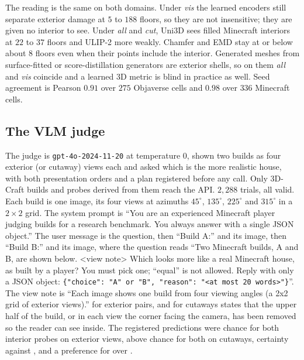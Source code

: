 The reading is the same on both domains. Under \emph{vis} the learned encoders still
separate exterior damage at $5$ to $188$ floors, so they are not insensitive; they are given
no interior to see. Under \emph{all} and \emph{cut}, Uni3D sees filled Minecraft interiors
at $22$ to $37$ floors and ULIP-2 more weakly. Chamfer and EMD stay at or below about $8$
floors even when their points include the interior. Generated meshes from surface-fitted or
score-distillation generators are exterior shells, so on them \emph{all} and \emph{vis}
coincide and a learned 3D metric is blind in practice as well. Seed agreement is Pearson
$0.91$ over $275$ Objaverse cells and $0.98$ over $336$ Minecraft cells.



\subsection{The VLM judge}
\label{app:vlm}

The judge is \texttt{gpt-4o-2024-11-20} at temperature $0$, shown two builds as four
exterior (or cutaway) views each and asked which is the more realistic house, with both
presentation orders and a plan registered before any call. Only 3D-Craft builds and probes
derived from them reach the API. $2{,}288$ trials, all valid. Each build is one image, its
four views at azimuths $45^\circ$, $135^\circ$, $225^\circ$ and $315^\circ$ in a $2{\times}2$
grid. The system prompt is \enquote{You are an experienced Minecraft player judging builds
for a research benchmark. You always answer with a single JSON object.} The user message
is the question, then \enquote{Build A:} and its image, then \enquote{Build B:} and its
image, where the question reads \enquote{Two Minecraft builds, A and B, are shown below.
\textless view note\textgreater{} Which looks more like a real Minecraft house, as built by
a player? You must pick one; ``equal'' is not allowed. Reply with only a JSON object:
\texttt{\{"choice": "A" or "B", "reason": "<at most 20 words>"\}}}. The view
note is \enquote{Each image shows one build from four viewing angles (a 2x2 grid of
exterior views).} for exterior pairs, and for cutaways states that the upper half of the
build, or in each view the corner facing the camera, has been removed so the reader can
see inside. The registered predictions were chance for both interior probes on exterior
views, above chance for both on cutaways, certainty against \randomvox{}, and a
preference for \gabled{} over \patchstitch{}.

